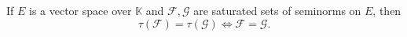 If $E$ is a vector space over $\mathbb{K}$ and $\mathcal{F}, \mathcal{G}$ are saturated sets of seminorms on $E$, then
$$\tau(\mathcal{F}) = \tau(\mathcal{G}) \iff \mathcal{F} = \mathcal{G}.$$
